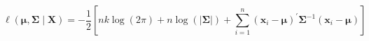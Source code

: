 \begin{equation}
    \ell
    \left(
    \boldsymbol{\mu},
    \boldsymbol{\Sigma}
    \mid
    \mathbf{X}
    \right)
    =
    -\frac{1}{2}
    \left[
    nk
    \log
    \left(
    2
    \pi
    \right)
    +
    n
    \log
    \left(
    \left|
    \boldsymbol{\Sigma}
    \right|
    \right)
    +
    \sum_{i = 1}^{n}
    \left(
      \mathbf{x}_{i}
      -
      \boldsymbol{\mu}
    \right)^{\prime}
    \boldsymbol{\Sigma}^{-1}
    \left(
      \mathbf{x}_{i}
      -
      \boldsymbol{\mu}
    \right)
    \right]
    \label{eq:multiNorm-mvn-loglikelihood}
\end{equation}